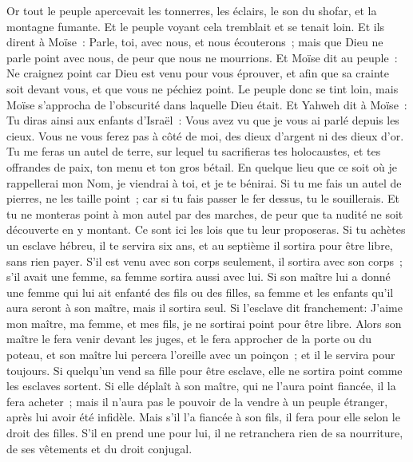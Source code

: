 \begin{multicols}{2}
Or tout le peuple apercevait les tonnerres, les éclairs, le son du shofar, et la montagne fumante. Et le peuple voyant cela tremblait et se tenait loin.
Et ils dirent à Moïse~: Parle, toi, avec nous, et nous écouterons~; mais que Dieu ne parle point avec nous, de peur que nous ne mourrions.
Et Moïse dit au peuple~: Ne craignez point car Dieu est venu pour vous éprouver, et afin que sa crainte soit devant vous, et que vous ne péchiez point.
Le peuple donc se tint loin, mais Moïse s'approcha de l'obscurité dans laquelle Dieu était.
Et Yahweh dit à Moïse~: Tu diras ainsi aux enfants d'Israël~: Vous avez vu que je vous ai parlé depuis les cieux.
Vous ne vous ferez pas à côté de moi, des dieux d'argent ni des dieux d'or.
Tu me feras un autel de terre, sur lequel tu sacrifieras tes holocaustes, et tes offrandes de paix, ton menu et ton gros bétail. En quelque lieu que ce soit où je rappellerai mon Nom, je viendrai à toi, et je te bénirai.
Si tu me fais un autel de pierres, ne les taille point~; car si tu fais passer le fer dessus, tu le souillerais.
Et tu ne monteras point à mon autel par des marches, de peur que ta nudité ne soit découverte en y montant.
\VerseOne{}Ce sont ici les lois que tu leur proposeras.
Si tu achètes un esclave hébreu, il te servira six ans, et au septième il sortira pour être libre, sans rien payer.
S'il est venu avec son corps seulement, il sortira avec son corps~; s'il avait une femme, sa femme sortira aussi avec lui.
Si son maître lui a donné une femme qui lui ait enfanté des fils ou des filles, sa femme et les enfants qu'il aura seront à son maître, mais il sortira seul.
Si l'esclave dit franchement: J'aime mon maître, ma femme, et mes fils, je ne sortirai point pour être libre.
Alors son maître le fera venir devant les juges, et le fera approcher de la porte ou du poteau, et son maître lui percera l'oreille avec un poinçon~; et il le servira pour toujours.
Si quelqu'un vend sa fille pour être esclave, elle ne sortira point comme les esclaves sortent.
Si elle déplaît à son maître, qui ne l'aura point fiancée, il la fera acheter~; mais il n'aura pas le pouvoir de la vendre à un peuple étranger, après lui avoir été infidèle.
Mais s'il l'a fiancée à son fils, il fera pour elle selon le droit des filles.
S'il en prend une pour lui, il ne retranchera rien de sa nourriture, de ses vêtements et du droit conjugal.

\end{multicols}
